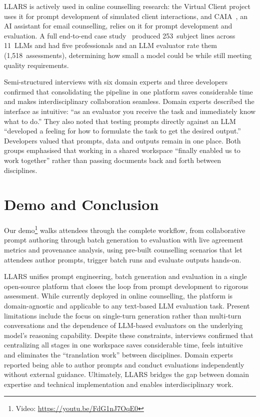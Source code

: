 \documentclass{article}
\begin{document}
LLARS is actively used in online counselling research: the Virtual Client project~\cite{rudolph2024virtualclient} uses it for prompt development of simulated client interactions, and CAIA~\cite{steigerwald2025caia}, an AI assistant for email counselling, relies on it for prompt development and evaluation.
A full end-to-end case study~\cite{steigerwald2025subjectline} produced 253~subject lines across 11~LLMs and had five professionals and an LLM evaluator rate them (1,518~assessments), determining how small a model could be while still meeting quality requirements.

Semi-structured interviews with six domain experts and three developers confirmed that consolidating the pipeline in one platform saves considerable time and makes interdisciplinary collaboration seamless.
Domain experts described the interface as intuitive: ``as an evaluator you receive the task and immediately know what to do.'' They also noted that testing prompts directly against an LLM ``developed a feeling for how to formulate the task to get the desired output.''
Developers valued that prompts, data and outputs remain in one place.
Both groups emphasised that working in a shared workspace ``finally enabled us to work together'' rather than passing documents back and forth between disciplines.

\section{Demo and Conclusion}

Our demo\footnote{Video: \url{https://youtu.be/FdG1nJ7OqE0}} walks attendees through the complete workflow, from collaborative prompt authoring through batch generation to evaluation with live agreement metrics and provenance analysis, using pre-built counselling scenarios that let attendees author prompts, trigger batch runs and evaluate outputs hands-on.

LLARS unifies prompt engineering, batch generation and evaluation in a single open-source platform that closes the loop from prompt development to rigorous assessment.
While currently deployed in online counselling, the platform is domain-agnostic and applicable to any text-based LLM evaluation task.
Present limitations include the focus on single-turn generation rather than multi-turn conversations and the dependence of LLM-based evaluators on the underlying model's reasoning capability.
Despite these constraints, interviews confirmed that centralizing all stages in one workspace saves considerable time, feels intuitive and eliminates the ``translation work'' between disciplines. Domain experts reported being able to author prompts and conduct evaluations independently without external guidance.
Ultimately, LLARS bridges the gap between domain expertise and technical implementation and enables interdisciplinary work.




\end{document}
